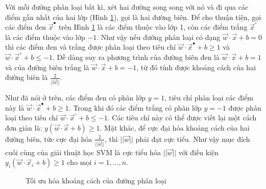 Với mỗi đường phân loại bất kì, xét hai đường song song với nó và đi qua các điểm gần nhất của hai lớp (Hình \ref{optimal-sep}), gọi là hai đường biên. Để cho thuận tiện, gọi các điểm đen $\vec{x}^\bullet$ trên Hình \ref{optimal-sep} là các điểm thuộc vào lớp 1, còn các điểm trắng $\vec{x}^\circ$ là các điểm thuộc vào lớp $-1$. Như vậy nếu đường phân loại có dạng $\vec{w}\cdot\vec{x}+b=0$ thì các điểm đen và trắng được phân loại theo tiêu chí $\vec{w}\cdot\vec{x}^\bullet+b\geq1$ và $\vec{w}\cdot\vec{x}^\circ+b\leq-1$. Dễ dàng suy ra phương trình của đường biên đen là $\vec{w}\cdot\vec{x}+b=1$ và của đường biên trắng là $\vec{w}\cdot\vec{x}+b=-1$, từ đó tính được khoảng cách của hai đường biên là $\frac{2}{||\vec{w}||}$.

Như đã nói ở trên, các điểm đen có phân lớp $y=1$, tiêu chí phân loại các điểm này là $\vec{w}\cdot\vec{x}^\bullet+b\geq1$. Trong khi đó các điểm trắng có phân lớp $y=-1$ được phân loại theo tiêu chí $\vec{w}\cdot\vec{x}^\circ+b\leq-1$. Các tiêu chí này có thể được viết lại một cách đơn giản là: $y(\vec{w}\cdot\vec{x}+b)\geq1$. Mặt khác, để cực đại hóa khoảng cách của hai đường biên, tức cực đại hóa $\frac{2}{||\vec{w}||}$, thì $||\vec{w}||$ phải đạt cực tiểu. Như vậy mục đích cuối cùng của giải thuật học SVM là cực tiểu hóa $||\vec{w}||$ với điều kiện $y_i(\vec{w}\cdot\vec{x}_i+b)\geq1$ cho mọi $i=1,\dots,n$.

\begin{figure}[ht]
\centering
{}
\caption{Tối ưu hóa khoảng cách của đường phân loại\label{optimal-sep}}
\end{figure}


